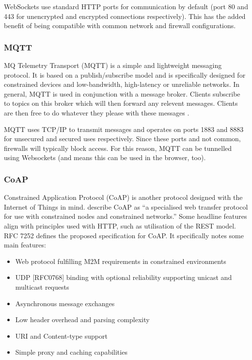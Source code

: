         WebSockets use standard HTTP ports for communication by default (port 80 and 443 for unencrypted and encrypted connections respectively). This has the added benefit of being compatible with common network and firewall configurations.

      \subsubsection{MQTT}
        MQ Telemetry Transport (MQTT) is a simple and lightweight messaging protocol. It is based on a publish/subscribe model and is specifically designed for constrained devices and low-bandwidth, high-latency or unreliable networks. In general, MQTT is used in conjunction with a message broker. Clients subscribe to topics on this broker which will then forward any relevent messages. Clients are then free to do whatever they please with these messages \citep{mqtt:2015}.

        MQTT uses TCP/IP to transmit messages and operates on ports 1883 and 8883 for unsecured and secured uses respectively. Since these ports and not common, firewalls will typically block access. For this reason, MQTT can be tunnelled using Websockets (and means this can be used in the browser, too).

      \subsubsection{CoAP}
        Constrained Application Protocol (CoAP) is another protocol designed with the Internet of Things in mind. \citet{rfc7252} describe CoAP as ``a specialised web transfer protocol for use with constrained nodes and constrained networks.'' Some headline features align with principles used with HTTP, such as utilisation of the REST model. RFC 7252 defines the proposed specification for CoAP. It specifically notes some main features:

        \begin{itemize}
          \item Web protocol fulfilling M2M requirements in constrained environments
          \item UDP [RFC0768] binding with optional reliability supporting unicast and multicast requests
          \item Asynchronous message exchanges
          \item Low header overhead and parsing complexity
          \item URI and Content-type support
          \item Simple proxy and caching capabilities
        \end{itemize}

